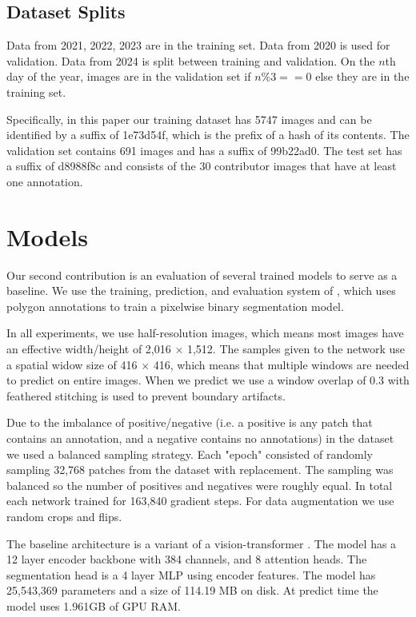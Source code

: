 \documentclass[10pt,twocolumn,letterpaper]{article}
\begin{document}
\subsection{Dataset Splits}

Data from 2021, 2022, 2023 are in the training set. Data from 2020 is used for
validation. Data from 2024 is split between training and validation. On the $n$th
day of the year, images are in the validation set if $n \% 3 == 0$ else they
are in the training set.

Specifically, in this paper our training dataset has 5747 images and can be
identified by a suffix of 1e73d54f, which is the prefix of a hash of its
contents.  The validation set contains 691 images and has a suffix of 99b22ad0.
The test set has a suffix of d8988f8c and consists of the 30 contributor images
that have at least one annotation.

\section{Models}

Our second contribution is an evaluation of several trained models to serve as
a baseline.  We use the training, prediction, and evaluation system of
\cite{Greenwell_2024_WACV, crall_geowatch_2024}, which uses polygon annotations
to train a pixelwise binary segmentation model.

In all experiments, we use half-resolution images, which means most images have
an effective width/height of 2,016 $\times$ 1,512. The samples given to the
network use a spatial widow size of 416 $\times$ 416, which means that multiple
windows are needed to predict on entire images. When we predict we use a window
overlap of 0.3 with feathered stitching is used to prevent boundary artifacts. 

Due to the imbalance of positive/negative (i.e. a positive is any patch that
contains an annotation, and a negative contains no annotations) in the dataset
we used a balanced sampling strategy.  Each "epoch" consisted of randomly
sampling 32,768 patches from the dataset with replacement.  The sampling was
balanced so the number of positives and negatives were roughly equal. In total
each network trained for 163,840 gradient steps. For data augmentation we use
random crops and flips.

The baseline architecture is a variant
\cite{bertasius2021space,Greenwell_2024_WACV} of a vision-transformer
\cite{dosovitskiy_image_2021}. The model has a 12 layer encoder backbone with
384 channels, and 8 attention heads. 
The segmentation head is a 4 layer MLP using encoder features.
The model has 25,543,369 parameters and a size of 114.19 MB on disk.
At predict time the model uses 1.961GB of GPU RAM.
\end{document}

